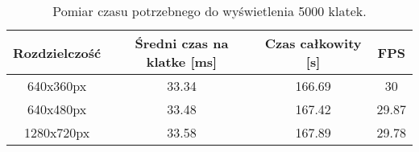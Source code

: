\begin{table}[H]
\centering
\caption{Pomiar czasu potrzebnego do wyświetlenia 5000 klatek.}
\begin{tabular}{|c|c|c|c|}
\hline
Rozdzielczość & Średni czas na klatke {[}ms{]} & Czas całkowity {[}s{]} & FPS   \\ \hline
640x360px     & 33.34                          & 166.69                 & 30    \\ \hline
640x480px     & 33.48                          & 167.42                 & 29.87 \\ \hline
1280x720px    & 33.58                          & 167.89                 & 29.78 \\ \hline
\end{tabular}
\label{tab:czas-calkowity-5000klatek}
\end{table}